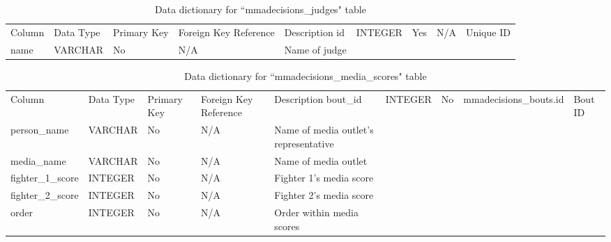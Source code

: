 \documentclass[12pt,twoside]{report}
\begin{document}
\newpage 
\tiny
\begin{longtable}{lllll}
\caption{Data dictionary for ``mmadecisions\_judges" table}\\ 
\toprule
Column & Data Type & Primary Key & Foreign Key Reference & Description    \endfirsthead 
\toprule
id     & INTEGER   & Yes         & N/A                   & Unique ID      \\
name   & VARCHAR   & No          & N/A                   & Name of judge  \\
\bottomrule
\end{longtable}
\normalsize

\tiny 
\begin{longtable}{lllll}
\caption{Data dictionary for ``mmadecisions\_media\_scores" table}\\ 
\toprule
Column            & Data Type & Primary Key & Foreign Key Reference  & Description                            \endfirsthead 
\toprule
bout\_id          & INTEGER   & No          & mmadecisions\_bouts.id & Bout ID                                \\
person\_name      & VARCHAR   & No          & N/A                    & Name of media outlet's representative  \\
media\_name       & VARCHAR   & No          & N/A                    & Name of media outlet                   \\
fighter\_1\_score & INTEGER   & No          & N/A                    & Fighter 1's media score                \\
fighter\_2\_score & INTEGER   & No          & N/A                    & Fighter 2's media score                \\
order             & INTEGER   & No          & N/A                    & Order within media scores              \\
\bottomrule
\end{longtable}
\normalsize
\end{document}
